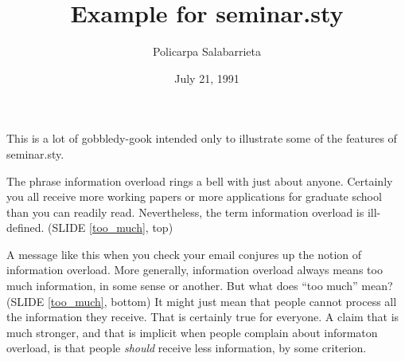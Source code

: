 \documentclass[ignorenonframetext]{beamer}
\title{Example for seminar.sty}
\author{Policarpa Salabarrieta}
\date{July 21, 1991}
\newcommand{\sref}[1]{SLIDE \ref{#1}}
\begin{document}
\frame{
\maketitle          %
}



This is a lot of gobbledy-gook intended only to illustrate some of the
features of seminar.sty.

 The phrase information overload rings a bell with just about anyone.
Certainly you all receive more working papers or more applications for
graduate school than you can readily read. Nevertheless, the term information
overload is ill-defined. (\sref{too_much}, top)

 A message like this when you check your email conjures up the notion of
information overload. More generally, information overload always means too
much information, in some sense or another. But what does ``too much'' mean?
(\sref{too_much}, bottom) It might just mean that people cannot process all
the information they receive. That is certainly true for everyone. A claim
that is much stronger, and that is implicit when people complain about
informaton overload, is that people {\em should} receive less information, by
some criterion.

{}
\end{document}
